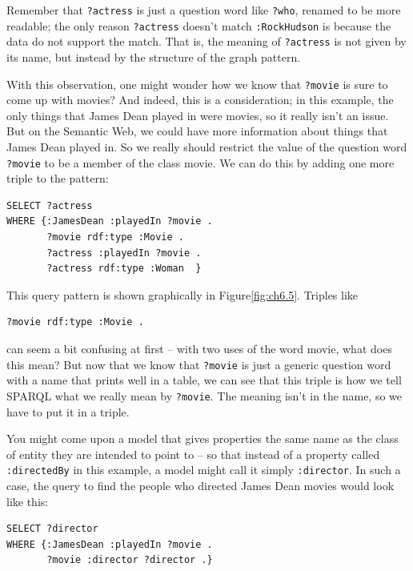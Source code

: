 Remember that \texttt{?actress} is just a question word like \texttt{?who}, renamed to be
more readable; the only reason \texttt{?actress} doesn't match \texttt{:RockHudson} is
because the data do not support the match. That is, the meaning of
\texttt{?actress} is not given by its name, but instead by the structure of the
graph pattern.

With this observation, one might wonder how we know that \texttt{?movie} is sure
to come up with movies? And indeed, this is a consideration; in this
example, the only things that James Dean played in were movies, so it
really isn't an issue. But on the Semantic Web, we could have more
information about things that James Dean played in. So we really should
restrict the value of the question word \texttt{?movie} to be a member of the
class movie. We can do this by adding one more triple to the pattern:


\begin{lstlisting}
SELECT ?actress
WHERE {:JamesDean :playedIn ?movie .
       ?movie rdf:type :Movie .
       ?actress :playedIn ?movie .
       ?actress rdf:type :Woman  }
\end{lstlisting}

This query pattern is shown graphically in Figure\ref{fig:ch6.5}. Triples like

\begin{lstlisting}
?movie rdf:type :Movie .
\end{lstlisting}

can seem a bit confusing at first -- with two uses of the word movie,
what does this mean? But now that we know that \texttt{?movie} is just a generic
question word with a name that prints well in a table, we can see that
this triple is how we tell SPARQL what we really mean by \texttt{?movie}. The
meaning isn't in the name, so we have to put it in a triple.

You might come upon a model that gives properties the same name as the
class of entity they are intended to point to -- so that instead of a
property called \texttt{:directedBy} in this example, a model might call it
simply \texttt{:director}. In such a case, the query to find the people who
directed James Dean movies would look like this:

\begin{lstlisting}
SELECT ?director
WHERE {:JamesDean :playedIn ?movie .
       ?movie :director ?director .}
\end{lstlisting}


